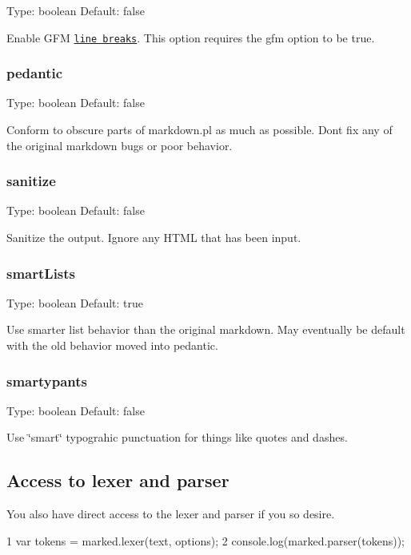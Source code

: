 Type\+: {\ttfamily boolean} Default\+: {\ttfamily false}

Enable G\+F\+M \href{https://help.github.com/articles/github-flavored-markdown#newlines}{\tt line breaks}. This option requires the {\ttfamily gfm} option to be true.

\subsubsection*{pedantic}

Type\+: {\ttfamily boolean} Default\+: {\ttfamily false}

Conform to obscure parts of {\ttfamily markdown.\+pl} as much as possible. Don\textquotesingle{}t fix any of the original markdown bugs or poor behavior.

\subsubsection*{sanitize}

Type\+: {\ttfamily boolean} Default\+: {\ttfamily false}

Sanitize the output. Ignore any H\+T\+M\+L that has been input.

\subsubsection*{smart\+Lists}

Type\+: {\ttfamily boolean} Default\+: {\ttfamily true}

Use smarter list behavior than the original markdown. May eventually be default with the old behavior moved into {\ttfamily pedantic}.

\subsubsection*{smartypants}

Type\+: {\ttfamily boolean} Default\+: {\ttfamily false}

Use \char`\"{}smart\char`\"{} typograhic punctuation for things like quotes and dashes.

\subsection*{Access to lexer and parser}

You also have direct access to the lexer and parser if you so desire.


\begin{DoxyCode}
1 var tokens = marked.lexer(text, options);
2 console.log(marked.parser(tokens));
\end{DoxyCode}




